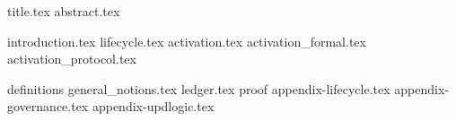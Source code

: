 \documentclass{llncs}
\begin{document}
{title.tex}
{abstract.tex}

{introduction.tex}
{lifecycle.tex}
{activation.tex}
{activation_formal.tex}
{activation_protocol.tex}


\appendix
{definitions}
{general_notions.tex}
{ledger.tex}
{proof}
{appendix-lifecycle.tex}
{appendix-governance.tex}
{appendix-updlogic.tex}
\end{document}
